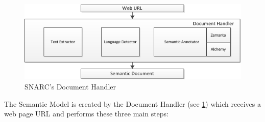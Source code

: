 \documentclass[oribibl]{../../Tools/LaTEX/llncs}
\begin{document}
\begin{figure}[!ht]
  \centering
    \includegraphics[scale=0.8]{architecture_document_handler.png}
  \caption{SNARC's Document Handler}
  \label{fig:architecture_document_handler}
\end{figure}

The Semantic Model is created by the Document Handler (see \ref{fig:architecture_document_handler}) which receives a web page URL and performs these three main steps:
\end{document}

